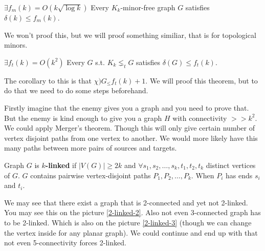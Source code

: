 \begin{thm}
	$\exists f_{m}(k) = O(k \sqrt{\log k})$ Every $K_{k}$-minor-free graph $G$ satisfies $\delta(k) \leq f_{m}(k)$.
\end{thm}

We won't proof this, but we will proof something similiar, that is for topological minors.

\begin{thm}
	$\exists f_{t}(k) = O(k^{2})$ Every $G$ s.t. $K_{k} \lneq_{t} G$ satisfies $\delta(G) \leq f_{t}(k)$.
\end{thm}

The corollary to this is that $\chi)G_ \leq f_{t}(k) +1$. We will proof this theorem, but to do that we need to do some steps beforehand.

Firstly imagine that the enemy gives you a graph and you need to prove that. But the enemy is kind enough to give you a graph $H$ with connectivity $>> k^2$. We could apply Merger's theorem. Though this will only give certain number of vertex disjoint paths from one vertex to another. We would more likely have this many paths between more pairs of sources and targets.

\begin{defn}
	Graph $G$ is \textbf{$k$-linked} if $|V(G)| \geq 2k$ and $\forall s_{1}, s_{2}, \dots, s_{k}, t_{1}, t_{2}, t_{k}$ distinct vertices of $G$. $G$ contains pairwise vertex-disjoint paths $P_{1}, P_{2}, \dots, P_{k}$. When $P_{i}$ has ends $s_{i}$ and $t_{i}$.
\end{defn}

We may see that there exist a graph that is 2-connected and yet not 2-linked. You may see this on the picture \ref{2-linked-2}. Also not even 3-connected graph has to be 2-linked. Which is also on the picture \ref{2-linked-3} (though we can change the vertex inside for any planar graph). We could continue and end up with that not even 5-connectivity forces 2-linked.

